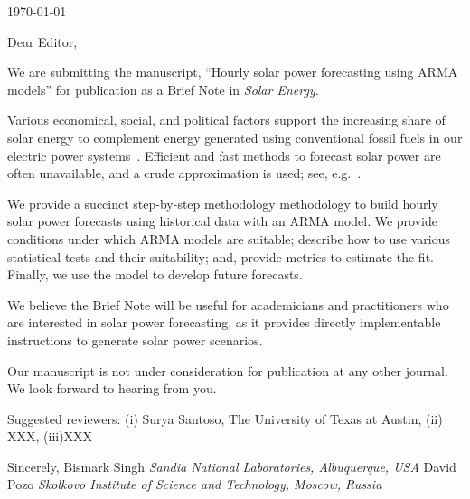 \documentclass[11pt]{article} %
\begin{document}






\today
\par
Dear Editor,
\par
We are submitting the manuscript, ``Hourly solar power forecasting using ARMA 
models'' for publication as a Brief Note in \textit{Solar Energy}.
\par
Various economical, social, and political factors support the increasing share 
of solar energy to complement energy generated using conventional fossil fuels 
in our electric power systems~\cite{stoddard2006economic}. Efficient and 
fast methods to forecast solar power are often unavailable, and a crude 
approximation is used; see, e.g.~\cite{su2014stochastic}.
\par
We provide a succinct step-by-step methodology methodology to build hourly 
solar power forecasts using historical data with an ARMA model. We provide 
conditions under which ARMA models are suitable; describe how to use 
various statistical tests and their suitability; and, provide metrics 
to estimate the fit. Finally, we use the model to develop future 
forecasts.

We believe the Brief Note will be useful for academicians and practitioners who 
are interested in solar power forecasting, as it provides directly 
implementable instructions to generate solar power scenarios. 
\par
Our manuscript is not under consideration for publication at any other journal. We look forward to hearing from you.
\par
Suggested reviewers: (i) Surya Santoso, The University of Texas at Austin, (ii) 
XXX, (iii)XXX
\par
Sincerely,
\newline
Bismark Singh
\newline
\textit{Sandia National Laboratories, Albuquerque, USA}
\newline
\noindent
David Pozo
\newline
\textit{Skolkovo Institute of Science and Technology, Moscow, Russia }
\end{document}
